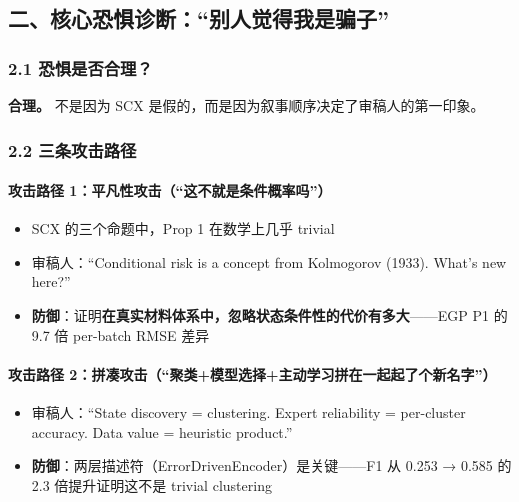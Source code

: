 \documentclass[
  12pt,
]{ctexart}
\providecommand{\tightlist}{%
  \setlength{\itemsep}{0pt}\setlength{\parskip}{0pt}}
\begin{document}
\subsection{二、核心恐惧诊断：``别人觉得我是骗子''}\label{ux4e8cux6838ux5fc3ux6050ux60e7ux8bcaux65adux522bux4ebaux89c9ux5f97ux6211ux662fux9a97ux5b50}

\subsubsection{2.1
恐惧是否合理？}\label{ux6050ux60e7ux662fux5426ux5408ux7406}

\textbf{合理。} 不是因为 SCX
是假的，而是因为叙事顺序决定了审稿人的第一印象。

\subsubsection{2.2
三条攻击路径}\label{ux4e09ux6761ux653bux51fbux8defux5f84}

\paragraph{攻击路径
1：平凡性攻击（``这不就是条件概率吗''）}\label{ux653bux51fbux8defux5f84-1ux5e73ux51e1ux6027ux653bux51fbux8fd9ux4e0dux5c31ux662fux6761ux4ef6ux6982ux7387ux5417}

\begin{itemize}
\tightlist
\item
  SCX 的三个命题中，Prop 1 在数学上几乎 trivial
\item
  审稿人：``Conditional risk is a concept from Kolmogorov (1933). What's
  new here?''
\item
  \textbf{防御}：证明\textbf{在真实材料体系中，忽略状态条件性的代价有多大}------EGP
  P1 的 9.7 倍 per-batch RMSE 差异
\end{itemize}

\paragraph{攻击路径
2：拼凑攻击（``聚类+模型选择+主动学习拼在一起起了个新名字''）}\label{ux653bux51fbux8defux5f84-2ux62fcux51d1ux653bux51fbux805aux7c7bux6a21ux578bux9009ux62e9ux4e3bux52a8ux5b66ux4e60ux62fcux5728ux4e00ux8d77ux8d77ux4e86ux4e2aux65b0ux540dux5b57}

\begin{itemize}
\tightlist
\item
  审稿人：``State discovery = clustering. Expert reliability =
  per-cluster accuracy. Data value = heuristic product.''
\item
  \textbf{防御}：两层描述符（ErrorDrivenEncoder）是关键------F1 从 0.253
  → 0.585 的 2.3 倍提升证明这不是 trivial clustering
\end{itemize}
\end{document}
